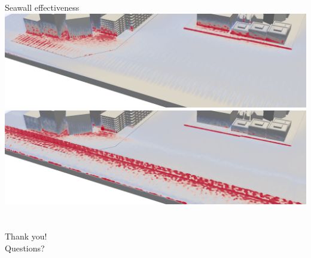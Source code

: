 \documentclass[8pt,sans,mathserif,aspectratio=43]{beamer}
\newcommand{\spacer}[0]{
  \vspace{5pt}}
\begin{document}
\begin{frame}{Seawall effectiveness}
  \includegraphics[width=\textwidth]{figures/if-city0-free.png}\\
  \includegraphics[width=\textwidth]{figures/if-city0-seawall.png}
\end{frame}



\section{}
\subsection{}
\begin{frame}
  \begin{center}
    \spacer\spacer\spacer\spacer\spacer\spacer
    Thank you!\\
    \spacer\spacer\spacer\spacer\spacer\spacer
    Questions?
  \end{center}
\end{frame}
\end{document}
